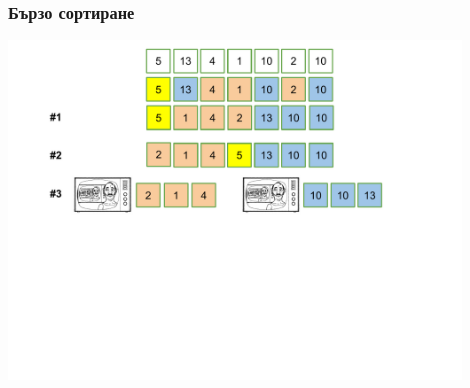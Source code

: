 \documentclass{beamer}
\begin{document}
\begin{frame}[fragile]
\frametitle{Бързо сортиране}

\begin{center}
   \includegraphics[width=12cm]{images/qsort}
\end{center}

\end{frame}
\end{document}
